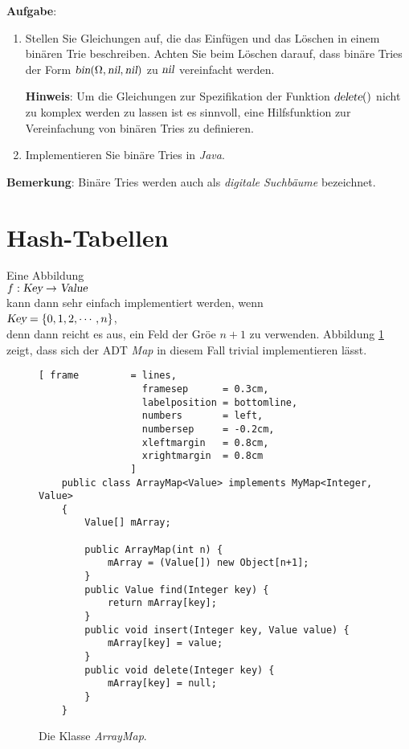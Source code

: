 \textbf{Aufgabe}: 
\begin{enumerate}
\item Stellen Sie Gleichungen auf, die das Einf\"ugen und das L\"oschen in einem
      bin\"aren Trie beschreiben.  Achten Sie beim L\"oschen darauf,
      dass bin\"are Tries der Form $\textsl{bin}(\Omega, \textsl{nil}, \textsl{nil})$
      zu $\textsl{nil}$ vereinfacht werden.

      \textbf{Hinweis}:  Um die Gleichungen zur Spezifikation der Funktion
      $\textsl{delete}()$ nicht zu komplex werden zu lassen ist es sinnvoll, eine
      Hilfsfunktion zur Vereinfachung von bin\"aren Tries zu definieren.
\item Implementieren Sie bin\"are Tries in \textsl{Java}.
\end{enumerate}
\textbf{Bemerkung}: Bin\"are Tries werden auch als \emph{digitale Suchb\"aume} bezeichnet.
\pagebreak


\section{Hash-Tabellen}
Eine Abbildung \\[0.2cm]
\hspace*{1.3cm} $f: \textsl{Key} \rightarrow \textsl{Value}$ \\[0.2cm]
kann dann sehr einfach implementiert werden, wenn \\[0.2cm]
\hspace*{1.3cm} $\textsl{Key} = \{ 0, 1, 2, \cdots, n \}$, \\[0.2cm]
denn dann reicht es aus, ein Feld der Gr\"o\3e $n+1$ zu verwenden.
Abbildung \ref{fig:ArrayMap} zeigt, dass sich der ADT \textsl{Map} 
in diesem Fall trivial implementieren l\"asst.

\begin{figure}[!ht]
  \centering
\begin{Verbatim}[ frame         = lines, 
                  framesep      = 0.3cm, 
                  labelposition = bottomline,
                  numbers       = left,
                  numbersep     = -0.2cm,
                  xleftmargin   = 0.8cm,
                  xrightmargin  = 0.8cm
                ]
    public class ArrayMap<Value> implements MyMap<Integer, Value>
    {
        Value[] mArray;
        
        public ArrayMap(int n) {
            mArray = (Value[]) new Object[n+1];
        }
        public Value find(Integer key) {
            return mArray[key];
        }
        public void insert(Integer key, Value value) {
            mArray[key] = value;
        }
        public void delete(Integer key) {
            mArray[key] = null;
        }
    }
\end{Verbatim}
\vspace*{-0.3cm}
  \caption{Die Klasse \textsl{ArrayMap}.}
  \label{fig:ArrayMap}
\end{figure}


